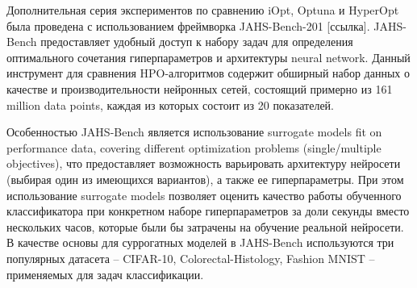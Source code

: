 \documentclass[iicol]{sn-jnl}
\theoremstyle{thmstyleone}%
\theoremstyle{thmstyletwo}%
\theoremstyle{thmstylethree}%
\begin{document}
Дополнительная серия экспериментов по сравнению iOpt, Optuna и HyperOpt была проведена с использованием фреймворка JAHS-Bench-201 [ссылка]. JAHS-Bench предоставляет удобный доступ к набору задач для определения оптимального сочетания гиперпараметров и архитектуры neural network. Данный инструмент для сравнения HPO-алгоритмов содержит обширный набор данных о качестве и производительности нейронных сетей, состоящий примерно из 161 million data points, каждая из которых состоит из 20 показателей.

\begin{table}
\centering
\caption{Values of optimized metrics for the algorithms averaged over 10 runs (surrogate models)}
\label{tab:met-surr}
\end{table}

Особенностью JAHS-Bench является использование surrogate models fit on performance data, covering different optimization problems (single/multiple objectives), что предоставляет возможность варьировать архитектуру нейросети (выбирая один из имеющихся вариантов), а также ее гиперпараметры. При этом использование surrogate models позволяет оценить качество работы обученного классификатора при конкретном наборе гиперпараметров за доли секунды вместо нескольких часов, которые были бы затрачены на обучение реальной нейросети. В качестве основы для суррогатных моделей в JAHS-Bench используются три популярных датасета -- CIFAR-10, Colorectal-Histology, Fashion MNIST -- применяемых для задач классификации.
\end{document}
